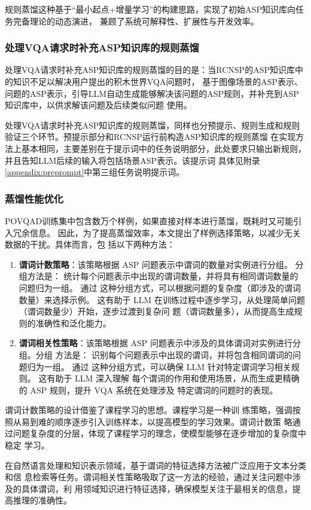 规则蒸馏这种基于“最小起点+增量学习”的构建思路，实现了初始ASP知识库向任务完备理论的动态演进，
兼顾了系统可解释性、扩展性与开发效率。
\subsubsection{处理VQA请求时补充ASP知识库的规则蒸馏}
处理VQA请求时补充ASP知识库的规则蒸馏的目的是：当RCNSP的ASP知识库中的知识不足以解决用户提出的积木世界VQA问题时，
基于图像场景的ASP表示、问题的ASP表示，引导LLM自动生成能够解决该问题的ASP规则，并补充到ASP知识库中，以供求解该问题及后续类似问题
使用。

处理VQA请求时补充ASP知识库的规则蒸馏，同样也分预提示、规则生成和规则验证三个环节。预提示部分和RCNSP运行前构造ASP知识库的规则蒸馏
在实现方法上基本相同，主要差别在于提示词中的任务说明部分，此处要求只输出新规则，并且告知LLM后续的输入将包括场景ASP表示。该提示词
具体见附录\ref{appendix:preprompt}中第三组任务说明提示词。
\subsubsection{蒸馏性能优化}
POVQAD训练集中包含数万个样例，如果直接对样本进行蒸馏，既耗时又可能引入冗余信息。
因此，为了提高蒸馏效率，本文提出了样例选择策略，以减少无关数据的干扰。具体而言，包
括以下两种方法：
\begin{enumerate}[nosep]
\item \textbf{谓词计数策略}：该策略根据 ASP 问题表示中谓词的数量对实例进行分组。 分组方法是：
统计每个问题表示中出现的谓词数量，并将具有相同谓词数量的问题归为一组。 通过
这种分组方式，可以根据问题的复杂度（即涉及的谓词数量）来选择示例。 这有助于
LLM 在训练过程中逐步学习，从处理简单问题（谓词数量少）开始，逐步过渡到复杂问
题（谓词数量多），从而提高生成规则的准确性和泛化能力。
\item \textbf{谓词相关性策略}：该策略根据 ASP 问题表示中涉及的具体谓词对实例进行分组。分组
方法是： 识别每个问题表示中出现的谓词，并将包含相同谓词的问题归为一组。 通过
这种分组方式，可以确保 LLM 针对特定谓词学习相关规则。 这有助于 LLM 深入理解
每个谓词的作用和使用场景，从而生成更精确的 ASP 规则，提升 VQA 系统在处理涉及
特定谓词的问题时的表现。
\end{enumerate}

谓词计数策略的设计借鉴了课程学习的思想。课程学习是一种训
练策略，强调按照从易到难的顺序逐步引入训练样本，以提高模型的学习效果。谓词计数策
略通过问题复杂度的分层，体现了课程学习的理念，使模型能够在逐步增加的复杂度中稳定
学习。

在自然语言处理和知识表示领域，基于谓词的特征选择方法被广泛应用于文本分类和信
息检索等任务。谓词相关性策略吸取了这一方法的经验，通过关注问题中涉及的具体谓词，利
用领域知识进行特征选择，确保模型关注于最相关的信息，提高推理的准确性。

